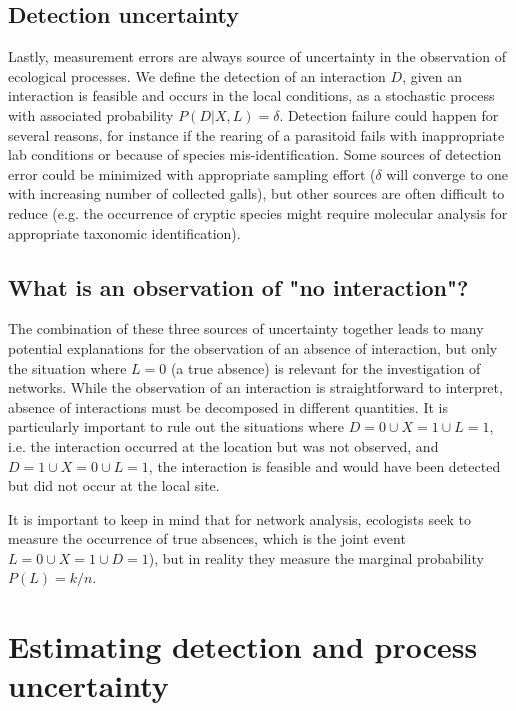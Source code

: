 \documentclass[12pt]{article}
\begin{document}
    \subsection*{Detection uncertainty} 

    Lastly, measurement errors are always source of uncertainty in the observation of ecological processes. We define the detection of an interaction $D$, given an interaction is feasible and occurs in the local conditions, as a stochastic process with associated probability $P(D|X,L)=\delta$. Detection failure could happen for several reasons, for instance if the rearing of a parasitoid fails with inappropriate lab conditions or because of species mis-identification. Some sources of detection error could be minimized with appropriate sampling effort ($\delta$ will converge to one with increasing number of collected galls), but other sources are often difficult to reduce (e.g. the occurrence of cryptic species might require molecular analysis for appropriate taxonomic identification).


    \subsection*{What is an observation of "no interaction"?} 

    The combination of these three sources of uncertainty together leads to many potential explanations for the observation of an absence of interaction, but only the situation where $L = 0$ (a true absence) is relevant for the investigation of networks. While the observation of an interaction is straightforward to interpret, absence of interactions must be decomposed in different quantities. It is particularly important to rule out the situations where $D=0 \cup X = 1 \cup L=1$, i.e. the interaction occurred at the location but was not observed, and $D=1 \cup X = 0 \cup L =1$, the interaction is feasible and would have been detected but did not occur at the local site. 


  It is important to keep in mind that for network analysis, ecologists seek to measure the occurrence of true absences, which is the joint event $L=0 \cup X=1 \cup D=1$), but in reality they measure the marginal probability $P(L) = k/n$. %


\section*{Estimating detection and process uncertainty}
\end{document}
